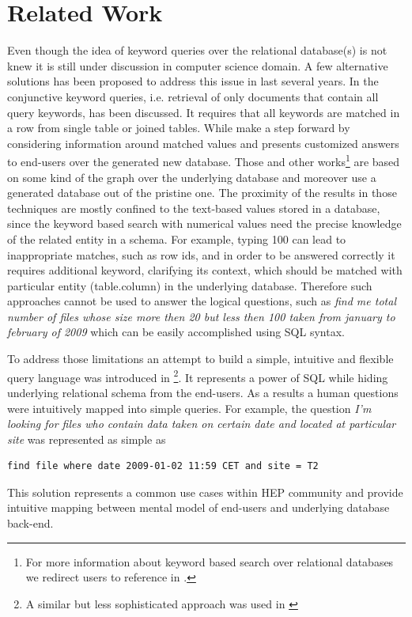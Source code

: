 \documentclass[a4paper]{jpconf}
\begin{document}
\section{Related Work\label{RelatedWork}}
Even though the idea of keyword queries over the relational database(s)
is not knew it is still under discussion in computer science domain.
A few alternative solutions has been proposed to address this issue
in last several years. In \cite{DBXplorer} the conjunctive keyword queries,
i.e. retrieval of only documents that contain all query keywords, has
been discussed. It requires that all keywords are matched in a row from
single table or joined tables. While \cite{QueryAnswer} make a step forward
by considering information around matched values and presents customized answers to
end-users over the generated new database. Those and other works\footnote{
For more information about
keyword based search over relational databases we redirect users to reference in
\cite{DBXplorer, QueryAnswer}.} 
are based on some kind of the graph over the underlying database and
moreover use a generated database out of the pristine one.
The proximity of the results in those techniques 
are mostly confined to the text-based values stored in a database, since the
keyword based search with numerical values 
need the precise knowledge of the related entity in a schema. For example, typing
100 can lead to inappropriate matches, such as row ids, and in order to be
answered correctly it requires additional keyword, clarifying its context, 
which should be matched with particular
entity (table.column) in the underlying database.
Therefore such approaches cannot be used to answer the logical questions, such as  
{\it find me total number of files whose size more then 20 but less then 
100 taken from january to february of 2009} which can be easily accomplished
using SQL syntax. 

To address those limitations an attempt to build a simple, intuitive and 
flexible query language was introduced in \cite{DBS-QL}\footnote{A similar but less
sophisticated approach was used in \cite{AMI}}.
It represents a power of SQL while hiding underlying relational schema from 
the end-users. As a results a human questions were intuitively mapped into 
simple queries. For example, the question
{\it I'm looking for files who contain data taken on certain date and located at
particular site} was represented as simple as \cite{DBS-QL}
\begin{verbatim}
find file where date 2009-01-02 11:59 CET and site = T2
\end{verbatim}
This solution represents a common use cases within HEP community and provide
intuitive mapping between mental model of end-users and underlying database back-end.
\end{document}
